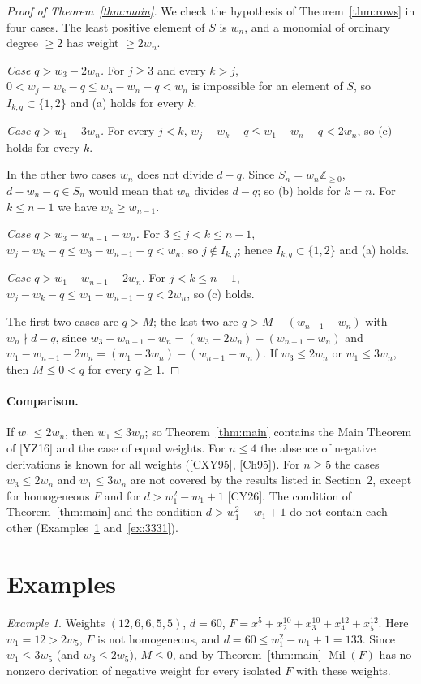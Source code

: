 \documentclass[11pt]{article}
\newcommand{\Mil}{\operatorname{Mil}(F)}
\theoremstyle{remark}
\newtheorem{example}[theorem]{Example}
\begin{document}
\begin{proof}[Proof of Theorem~\ref{thm:main}]
We check the hypothesis of Theorem~\ref{thm:rows} in four cases. The least positive element of $S$ is $w_n$, and a monomial of ordinary degree $\ge2$ has weight $\ge2w_n$.

\emph{Case $q>w_3-2w_n$.} For $j\ge3$ and every $k>j$, $0<w_j-w_k-q\le w_3-w_n-q<w_n$ is impossible for an element of $S$, so $I_{k,q}\subset\{1,2\}$ and (a) holds for every $k$.

\emph{Case $q>w_1-3w_n$.} For every $j<k$, $w_j-w_k-q\le w_1-w_n-q<2w_n$, so (c) holds for every $k$.

In the other two cases $w_n$ does not divide $d-q$. Since $S_n=w_n\mathbb Z_{\ge0}$, $d-w_n-q\in S_n$ would mean that $w_n$ divides $d-q$; so (b) holds for $k=n$. For $k\le n-1$ we have $w_k\ge w_{n-1}$.

\emph{Case $q>w_3-w_{n-1}-w_n$.} For $3\le j<k\le n-1$, $w_j-w_k-q\le w_3-w_{n-1}-q<w_n$, so $j\notin I_{k,q}$; hence $I_{k,q}\subset\{1,2\}$ and (a) holds.

\emph{Case $q>w_1-w_{n-1}-2w_n$.} For $j<k\le n-1$, $w_j-w_k-q\le w_1-w_{n-1}-q<2w_n$, so (c) holds.

The first two cases are $q>M$; the last two are $q>M-(w_{n-1}-w_n)$ with $w_n\nmid d-q$, since $w_3-w_{n-1}-w_n=(w_3-2w_n)-(w_{n-1}-w_n)$ and $w_1-w_{n-1}-2w_n=(w_1-3w_n)-(w_{n-1}-w_n)$. If $w_3\le2w_n$ or $w_1\le3w_n$, then $M\le0<q$ for every $q\ge1$.
\end{proof}

\paragraph{Comparison.} If $w_1\le2w_n$, then $w_1\le3w_n$; so Theorem~\ref{thm:main} contains the Main Theorem of [YZ16] and the case of equal weights. For $n\le4$ the absence of negative derivations is known for all weights ([CXY95], [Ch95]). For $n\ge5$ the cases $w_3\le2w_n$ and $w_1\le3w_n$ are not covered by the results listed in Section~2, except for homogeneous $F$ and for $d>w_1^2-w_1+1$ [CY26]. The condition of Theorem~\ref{thm:main} and the condition $d>w_1^2-w_1+1$ do not contain each other (Examples~\ref{ex:126655} and~\ref{ex:3331}).

\section{Examples}

\begin{example}\label{ex:126655}
Weights $(12,6,6,5,5)$, $d=60$, $F=x_1^5+x_2^{10}+x_3^{10}+x_4^{12}+x_5^{12}$. Here $w_1=12>2w_5$, $F$ is not homogeneous, and $d=60\le w_1^2-w_1+1=133$. Since $w_1\le3w_5$ (and $w_3\le2w_5$), $M\le0$, and by Theorem~\ref{thm:main} $\Mil$ has no nonzero derivation of negative weight for every isolated $F$ with these weights.
\end{example}
\end{document}
